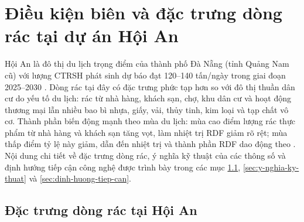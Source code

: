 \documentclass[../main.tex]{subfiles}
\begin{document}
\begin{table}[htbp]
\centering
\caption{Một số thông số nước thải cần xét theo QCVN 40:2025/BTNMT}
\label{tab:gioi-han-nuoc-thai-qcvn40}
\setlength{\tabcolsep}{6pt}
\end{table}

\section{Điều kiện biên và đặc trưng dòng rác tại dự án Hội An}
\label{sec:dieu-kien-bien-hoi-an}

Hội An là đô thị du lịch trọng điểm của thành phố Đà Nẵng (tỉnh Quảng Nam cũ) với lượng CTRSH phát sinh dự báo đạt 120--140 tấn/ngày trong giai đoạn 2025--2030 \cite{BaocaoHoiAn2024}. Dòng rác tại đây có đặc trưng phức tạp hơn so với đô thị thuần dân cư do yếu tố du lịch: rác từ nhà hàng, khách sạn, chợ, khu dân cư và hoạt động thương mại lẫn nhiều bao bì nhựa, giấy, vải, thủy tinh, kim loại và tạp chất vô cơ. Thành phần biến động mạnh theo mùa du lịch: mùa cao điểm lượng rác thực phẩm từ nhà hàng và khách sạn tăng vọt, làm nhiệt trị RDF giảm rõ rệt; mùa thấp điểm tỷ lệ này giảm, dẫn đến nhiệt trị và thành phần RDF dao động theo \cite{BaocaoHoiAn2024}. Nội dung chi tiết về đặc trưng dòng rác, ý nghĩa kỹ thuật của các thông số và định hướng tiếp cận công nghệ được trình bày trong các mục \ref{sec:dac-trung-dong-rac}, \ref{sec:y-nghia-ky-thuat} và \ref{sec:dinh-huong-tiep-can}.

\subsection{Đặc trưng dòng rác tại Hội An}
\label{sec:dac-trung-dong-rac}
\end{document}
